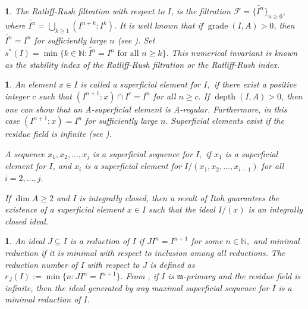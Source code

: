 \documentclass[11pt]{amsart}
\theoremstyle{plain}
\newtheorem{point}[theorem]{}
\newcommand{\m}{\mathfrak{m}}
\newcommand{\wt}{\widetilde}
\newcommand{\grade}{\operatorname{grade}}
\newcommand{\depth}{\operatorname{depth}}
\theoremstyle{plain}
\begin{document}
\begin{point} \label{ratliffrushfiltration}
\normalfont
The \textit{Ratliff-Rush filtration} with respect to $I$, is the filtration  $\mathcal{F}=\{\widetilde{I^{n}}\}_{n \geq 0},$ where $\wt{I^n}=\displaystyle \bigcup_{k\geq 1}(I^{n+k}:I^k).$ It is well known that if $\grade(I,A)>0$, then  $\widetilde{I^{n}}=I^{n}$ for sufficiently large $n$ (see \cite{MR506202}).  Set $s^{*}(I)=\min\{k \in \mathbb{N}: \widetilde{I^{n}}=I^{n} \text{ for all } n \geq k\}.$
This numerical invariant is known as the \textit{stability index} of the Ratliff-Rush filtration or the \textit{Ratliff-Rush index.}
\end{point}

\begin{point}\label{superf}
 \normalfont
    An element $x\in I $ is called a \textit{superficial element} for $I,$ if there exist a positive integer $c$ such that $(I^{n+1}:x) \cap I^{c}=I^{n}$ for all $n \geq c.$ If $\depth(I, A) > 0$, then one can show that an A-superficial element is A-regular. Furthermore,
in this case %
 $(I^{n+1} :x) = I^n$ for sufficiently large $n.$ Superficial elements exist if the residue field is infinite (see \cite[Pg. 7]{sally1978numbers}). 
 
 A sequence $x_{1},x_{2},\ldots,x_{j}$ is  a \textit{superficial sequence} for $I,$ if $x_{1}$ is a superficial element for $I$, and $x_{i}$ is a superficial element for $I/(x_{1},x_{2},\ldots,x_{i-1})$ for all $i=2,\ldots,j.$ 

 If $\dim A\geq 2$ and $I$ is integrally closed, then a result of Itoh \cite[Page 648]{itoh1} guarantees the existence of a superficial element $x \in I$ such that the ideal $I/(x)$ is an integrally closed ideal.

\end{point}

\begin{point}\label{reduction}
    \normalfont   An ideal $J \subseteq I$ is a \textit{reduction} of $I$ if $JI^{n}=I^{n+1}$ for some $n \in \mathbb{N,}$ 
and  \textit{minimal reduction} if it is minimal with respect to inclusion among all reductions. The \textit{reduction number} of $I$ with respect to $J$ is defined as 
   $r_{J}(I):=\min\{n: JI^{n}=I^{n+1}\}.$ From \cite[page 12]{rossi2010hilbert}, if $I$ is $\m$-primary and the residue field is infinite, then the ideal generated  by any maximal superficial sequence for $I$ is a minimal reduction of $I$.
\end{point}
\end{document}
